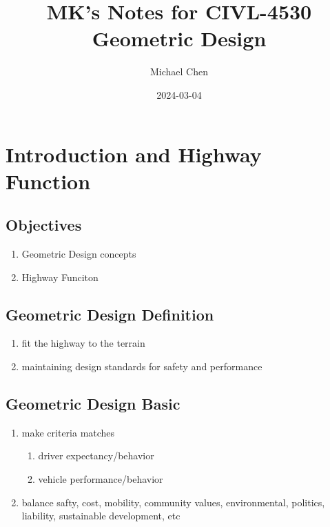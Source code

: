 \documentclass{article}
\title{MK's Notes for CIVL-4530 Geometric Design}
\date{2024-03-04}
\author{Michael Chen}
\begin{document}
  \setcounter{section}{0}



  \section{Introduction and Highway Function}
  \subsection{Objectives}
  \begin{enumerate}
    \item Geometric Design concepts
    \item Highway Funciton
  \end{enumerate}

  \subsection{Geometric Design Definition}
  \begin{enumerate}
    \item fit the highway to the terrain
    \item maintaining design standards for safety and performance
  \end{enumerate}

  \subsection{Geometric Design Basic}
  \begin{enumerate}
    \item make criteria matches  
    \begin{enumerate}
      \item driver expectancy/behavior
      \item vehicle performance/behavior
    \end{enumerate}
    \item balance safty, cost, mobility, community values, environmental, politics, liability, sustainable development, etc
  \end{enumerate}
\end{document}
